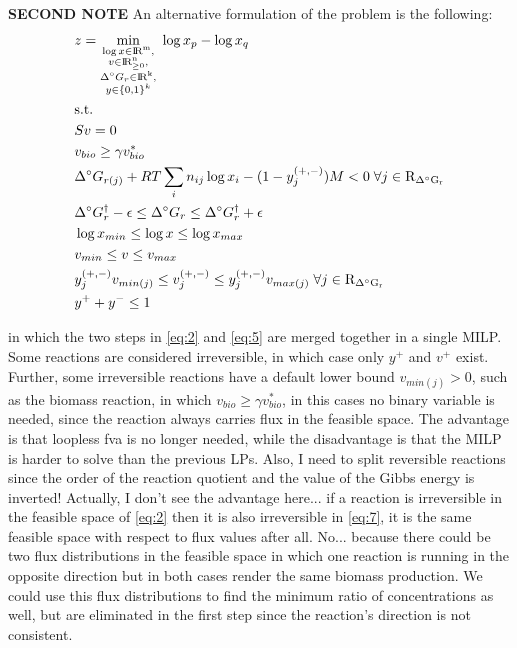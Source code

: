 \documentclass[12pt]{article}
\begin{document}
  \noindent \textbf{SECOND NOTE}
  An alternative formulation of the problem is the following:
  \begin{align}
    \begin{aligned}
      \label{eq:8}
      &z = \min_{\substack{ \log{x} \in \rm I\!R^m, \\
                            v \in \rm I\!R^n_{\geq 0}, \\
                            \Delta^{\circ} G_{r} \in \rm I\!R^k, \\
                            y \in \{0, 1\}^k }} \; \log{x_p} - \log{x_q}
      \\
      &\mathrm{s.t.}
      \\
      &Sv = 0
      \\
      &v_{bio} \geq \gamma v^*_{bio}
      \\
      &\Delta^{\circ} G_{r(j)} + RT \sum_i n_{ij} \log{x_i} - (1 - y_j^{(+, -)})M< 0 \; \forall j \in \mathrm{R_{\Delta^{\circ} G_{r}}}
      \\
      &\Delta^{\circ} G_{r}^{\dagger} - \epsilon \leq \Delta^{\circ} G_{r} \leq \Delta^{\circ} G_{r}^{\dagger} + \epsilon
      \\
      &\log{x}_{min} \leq \log{x} \leq \log{x}_{max}
      \\
      &v_{min} \leq v \leq v_{max}
      \\
      &y_j^{(+, -)} v_{min(j)} \leq v^{(+, -)}_j \leq y_j^{(+, -)} v_{max(j)} \; \forall j \in \mathrm{R_{\Delta^{\circ} G_{r}}}
      \\
      &y^+ + y^- \leq 1
    \end{aligned}
  \end{align}

  \noindent in which the two steps in \ref{eq:2} and \ref{eq:5} are merged together in a single MILP. Some reactions are considered irreversible, in which case only $y^+$ and $v^+$ exist. Further, some irreversible reactions have a default lower bound $v_{min(j)} > 0$, such as the biomass reaction, in which $v_{bio} \geq \gamma v^*_{bio}$, in this cases no binary variable is needed, since the reaction always carries flux in the feasible space. The advantage is that loopless fva is no longer needed, while the disadvantage is that the MILP is harder to solve than the previous LPs. Also, I need to split reversible reactions since the order of the reaction quotient and the value of the Gibbs energy is inverted! Actually, I don't see the advantage here... if a reaction is irreversible in the feasible space of \ref{eq:2} then it is also irreversible in \ref{eq:7}, it is the same feasible space with respect to flux values after all. No... because there could be two flux distributions in the feasible space in which one reaction is running in the opposite direction but in both cases render the same biomass production. We could use this flux distributions to find the minimum ratio of concentrations as well, but are eliminated in the first step since the reaction's direction is not consistent.





  
\end{document}

